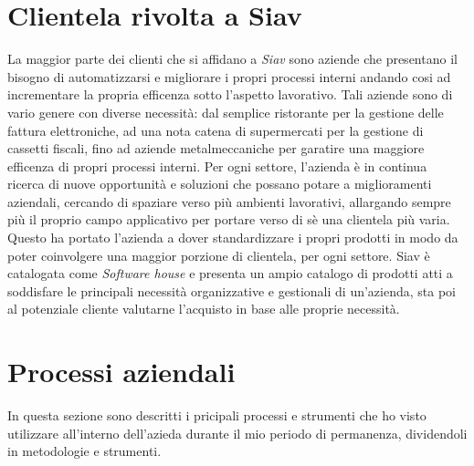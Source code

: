 \section{Clientela rivolta a Siav}
La maggior parte dei clienti che si affidano a \textit{Siav} sono aziende che presentano il bisogno di automatizzarsi e migliorare i propri processi interni andando cosi ad incrementare la propria efficenza sotto l'aspetto lavorativo. Tali aziende sono di vario genere con diverse necessità: dal semplice ristorante per la gestione delle fattura elettroniche, ad una nota catena di supermercati per la gestione di cassetti fiscali, fino ad aziende metalmeccaniche per garatire una maggiore efficenza di propri processi interni. Per ogni settore, l'azienda è in continua ricerca di nuove opportunità e soluzioni che possano potare a miglioramenti aziendali, cercando di spaziare verso più ambienti lavorativi, allargando sempre più il proprio campo applicativo per portare verso di sè una clientela più varia. Questo ha portato l'azienda a dover standardizzare i propri prodotti in modo da poter coinvolgere una maggior porzione di clientela, per ogni settore.
Siav è catalogata come \textit{Software house} e presenta un ampio catalogo di prodotti atti a soddisfare le principali necessità organizzative e gestionali di un'azienda, sta poi al potenziale cliente valutarne l'acquisto in base alle proprie necessità.
\section {Processi aziendali}
In questa sezione sono descritti i pricipali processi e strumenti che ho visto utilizzare all'interno dell'azieda durante il mio periodo di permanenza, dividendoli in metodologie e strumenti.
